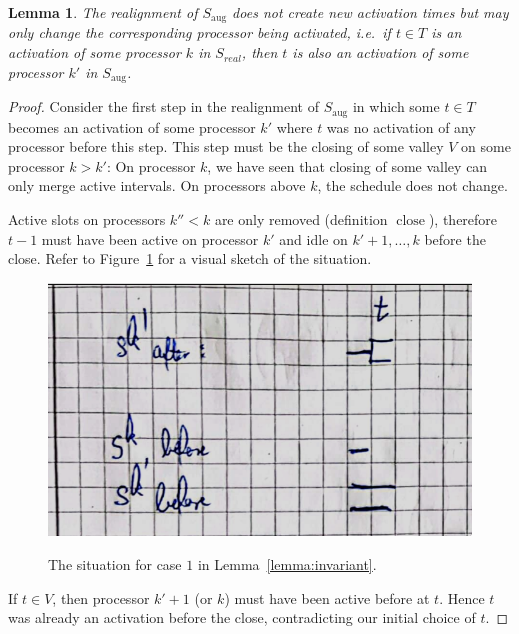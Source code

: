 \documentclass[a4paper]{article}
\DeclareMathOperator{\aug}{aug}
\DeclareMathOperator{\close}{close}
\newtheorem{lemma}[theorem]{Lemma}
\begin{document}
\begin{lemma}\label{lemma:activations}
  The realignment of $S_{\aug}$ does not create new activation times but may only change the corresponding processor being activated, i.e.\ if $t \in T$ is an activation of some processor $k$ in $S_{real}$, then $t$ is also an activation of some processor $k'$ in $S_{\aug}$.
\end{lemma}
\begin{proof}
  Consider the first step in the realignment of $S_{\aug}$ in which some $t \in T$ becomes an activation of some processor $k'$ where $t$ was no activation of any processor before this step.
  This step must be the closing of some valley $V$ on some processor $k > k'$:
  On processor $k$, we have seen that closing of some valley can only merge active intervals.
  On processors above $k$, the schedule does not change.

  Active slots on processors $k'' < k$ are only removed (definition $\close$), therefore $t-1$ must have been active on processor $k'$ and idle on $k' + 1, \ldots, k$ before the close.
  Refer to Figure~\ref{fig:activations} for a visual sketch of the situation.

  \begin{figure}[H]
    \centering
    \includegraphics[width=\textwidth]{graphics/sketches/activations.png}\label{fig:activations}
    \caption{The situation for case $1$ in Lemma~\ref{lemma:invariant}.}
  \end{figure}

  If $t \in V$, then processor $k' + 1$ (or $k$) must have been active before at $t$.
  Hence $t$ was already an activation before the close, contradicting our initial choice of $t$.


\end{proof}
\end{document}
